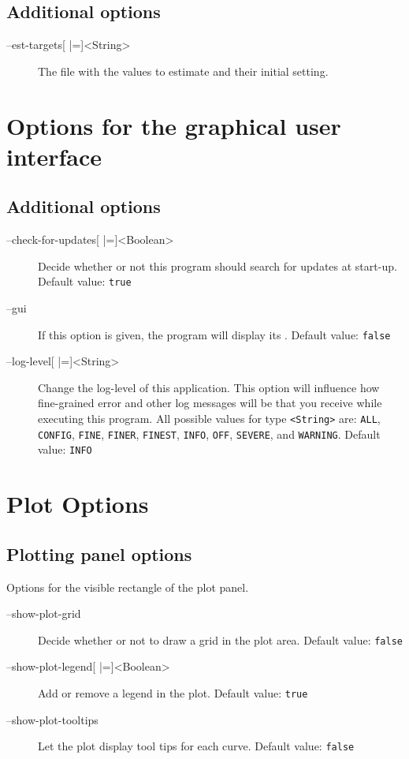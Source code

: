 \subsection{Additional options}
\begin{description}
\item[--est-targets{[} |={]}<String>]
          The file with the values to estimate and their initial setting.
\end{description}

\section{Options for the graphical user interface}
\subsection{Additional options}
\begin{description}
\item[--check-for-updates{[} |={]}<Boolean>]
          Decide whether or not this program should search for updates
          at start-up.
          Default value: \texttt{true}
\item[--gui]
          If this option is given, the program will display its \GUI.
          Default value: \texttt{false}
\item[--log-level{[} |={]}<String>]
          Change the log-level of this application. This option will influence
          how fine-grained error and other log messages will be that you
          receive while executing this program.
          All possible values for type \texttt{<String>} are:
          \texttt{ALL}, \texttt{CONFIG},
          \texttt{FINE}, \texttt{FINER},
          \texttt{FINEST}, \texttt{INFO},
          \texttt{OFF}, \texttt{SEVERE}, and \texttt{WARNING}.
          Default value: \texttt{INFO}
\end{description}

\section{Plot Options}
\subsection{Plotting panel options}
Options for the visible rectangle of the plot panel.
\begin{description}
\item[--show-plot-grid]
          Decide whether or not to draw a grid in the plot area.
          Default value: \texttt{false}
\item[--show-plot-legend{[} |={]}<Boolean>]
          Add or remove a legend in the plot.
          Default value: \texttt{true}
\item[--show-plot-tooltips]
          Let the plot display tool tips for each curve.
          Default value: \texttt{false}
\end{description}

